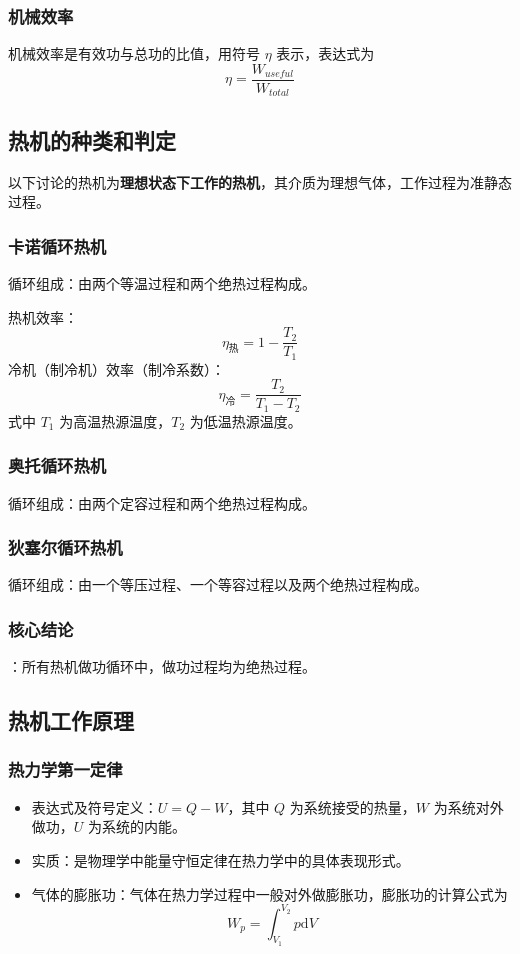 \documentclass{article}
\begin{document}
	\subsubsection{机械效率}
	机械效率是有效功与总功的比值，用符号 $\eta$ 表示，表达式为
	\[
	\eta=\frac{W_{useful}}{W_{total}}
	\]
	

	
	
	
	
	\subsection{热机的种类和判定}
	以下讨论的热机为\textbf{理想状态下工作的热机}，其介质为理想气体，工作过程为准静态过程。
	
	
	\subsubsection{卡诺循环热机}
	循环组成：由两个等温过程和两个绝热过程构成。
	
	热机效率：
	\[
	\eta_{\mathrm{热}} = 1-\frac{T_2}{T_1}
	\]
	冷机（制冷机）效率（制冷系数）：
	\[
	\eta_{\mathrm{冷}} = \frac{T_2}{T_1-T_2}
	\]
	式中 $T_1$ 为高温热源温度，$T_2$ 为低温热源温度。
	
	\subsubsection{奥托循环热机}
	循环组成：由两个定容过程和两个绝热过程构成。
	
	\subsubsection{狄塞尔循环热机}
	循环组成：由一个等压过程、一个等容过程以及两个绝热过程构成。
	
	\subsubsection{核心结论}：所有热机做功循环中，做功过程均为绝热过程。
	
	
	
	
	
	\subsection{热机工作原理}
	
	\subsubsection{热力学第一定律}
	\begin{itemize}[leftmargin=2em]
		\item 表达式及符号定义：$U = Q - W$，其中 $Q$ 为系统接受的热量，$W$ 为系统对外做功，$U$ 为系统的内能。
		\item 实质：是物理学中能量守恒定律在热力学中的具体表现形式。
		\item 气体的膨胀功：气体在热力学过程中一般对外做膨胀功，膨胀功的计算公式为
		\[
		W_p=\int_{V_1}^{V_2}p\mathrm{d}V
		\]
	\end{itemize}
	
\end{document}
